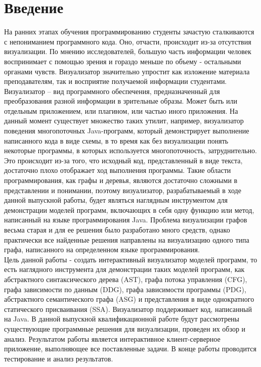 \chapter*{Введение} %

На ранних этапах обучения программированию студенты зачастую сталкиваются с непониманием программного кода. Оно, отчасти, происходит из-за отсутствия визуализации. По мнению исследователей, большую часть информации человек воспринимает с помощью зрения и гораздо меньше по объему - остальными органами чувств. Визуализатор значительно упростит как изложение материала преподавателям, так и восприятие получаемой информации студентами. Визуализатор – вид программного обеспечения, предназначенный для преобразования разной информации в зрительные образы. Может быть или отдельным приложением, или плагином, или частью иного приложения. На данный момент существует множество таких утилит, например, визуализатор поведения многопоточных Java-программ, который демонстрирует выполнение написанного кода в виде схемы, в то время как без визуализации понять некоторые программы, в которых используется многопоточность, затруднительно. Это происходит из-за того, что исходный код, представленный в виде текста, достаточно плохо отображает ход выполнения программы.
Такие области программирования, как графы и деревья, являются достаточно сложными в представлении и понимании, поэтому визуализатор, разрабатываемый в ходе данной выпускной работы, будет являться наглядным инструментом для демонстрации моделей программ, включающих в себя одну функцию или метод, написанный на языке программирования Java. Проблема визуализации графов весьма старая и для ее решения было разработано много средств, однако практически все найденные решения направлены на визуализацию одного типа графа, написанного на определенном языке программирования.\\
Цель данной работы - создать интерактивный визуализатор моделей программ, то есть наглядного инструмента для демонстрации таких моделей программ, как абстрактного синтаксического дерева (AST), графа потока управления (CFG), графа зависимости по данным (DDG), графа зависимости программы (PDG), абстрактного семантического графа (ASG) и представления в виде однократного статического присваивания (SSA). Визуализатор поддерживает код, написанный на Java.
В данной выпускной квалификационной работе будут рассмотрены существующие программные решения для визуализации, проведен их обзор и анализ. Результатом работы является интерактивное клиент-серверное приложение, выполняющее все поставленные задачи. В конце работы проводится тестирование и анализ результатов.  
